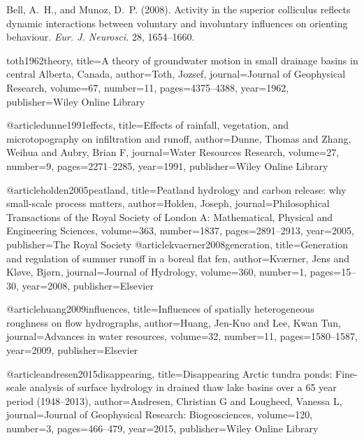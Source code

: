 \begin{thebibliography}{}

 Bell, A.~H., and
Munoz, D.~P.  (2008). Activity in the superior colliculus reflects
dynamic interactions between voluntary and involuntary influences on
orienting behaviour. \textit{Eur. J. Neurosci.} 28, 1654--1660.

{toth1962theory,
  title={A theory of groundwater motion in small drainage basins in central Alberta, Canada},
  author={Toth, Jozsef},
  journal={Journal of Geophysical Research},
  volume={67},
  number={11},
  pages={4375--4388},
  year={1962},
  publisher={Wiley Online Library}
}

@article{dunne1991effects,
  title={Effects of rainfall, vegetation, and microtopography on infiltration and runoff},
  author={Dunne, Thomas and Zhang, Weihua and Aubry, Brian F},
  journal={Water Resources Research},
  volume={27},
  number={9},
  pages={2271--2285},
  year={1991},
  publisher={Wiley Online Library}
}

@article{holden2005peatland,
  title={Peatland hydrology and carbon release: why small-scale process matters},
  author={Holden, Joseph},
  journal={Philosophical Transactions of the Royal Society of London A: Mathematical, Physical and Engineering Sciences},
  volume={363},
  number={1837},
  pages={2891--2913},
  year={2005},
  publisher={The Royal Society}
}
@article{kvaerner2008generation,
  title={Generation and regulation of summer runoff in a boreal flat fen},
  author={Kv{\ae}rner, Jens and Kl{\o}ve, Bj{\o}rn},
  journal={Journal of Hydrology},
  volume={360},
  number={1},
  pages={15--30},
  year={2008},
  publisher={Elsevier}
}

@article{huang2009influences,
  title={Influences of spatially heterogeneous roughness on flow hydrographs},
  author={Huang, Jen-Kuo and Lee, Kwan Tun},
  journal={Advances in water resources},
  volume={32},
  number={11},
  pages={1580--1587},
  year={2009},
  publisher={Elsevier}
}

@article{andresen2015disappearing,
  title={Disappearing Arctic tundra ponds: Fine-scale analysis of surface hydrology in drained thaw lake basins over a 65 year period (1948--2013)},
  author={Andresen, Christian G and Lougheed, Vanessa L},
  journal={Journal of Geophysical Research: Biogeosciences},
  volume={120},
  number={3},
  pages={466--479},
  year={2015},
  publisher={Wiley Online Library}
}


\end{thebibliography}
